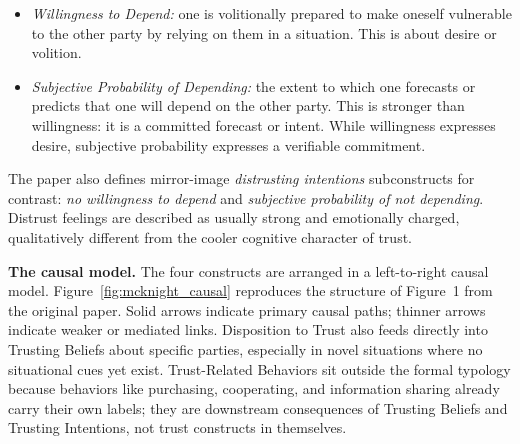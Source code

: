 \documentclass[11pt, a4paper]{article}
\begin{document}
\begin{itemize}[leftmargin=2em]
  \item \textit{Willingness to Depend:} one is volitionally prepared to make oneself vulnerable to the other party by relying on them in a situation. This is about desire or volition.
  \item \textit{Subjective Probability of Depending:} the extent to which one forecasts or predicts that one will depend on the other party. This is stronger than willingness: it is a committed forecast or intent. While willingness expresses desire, subjective probability expresses a verifiable commitment.
\end{itemize}

The paper also defines mirror-image \textit{distrusting intentions} subconstructs for contrast: \textit{no willingness to depend} and \textit{subjective probability of not depending}. Distrust feelings are described as usually strong and emotionally charged, qualitatively different from the cooler cognitive character of trust.

\textbf{The causal model.} The four constructs are arranged in a left-to-right causal model. Figure~\ref{fig:mcknight_causal} reproduces the structure of Figure~1 from the original paper. Solid arrows indicate primary causal paths; thinner arrows indicate weaker or mediated links. Disposition to Trust also feeds directly into Trusting Beliefs about specific parties, especially in novel situations where no situational cues yet exist. Trust-Related Behaviors sit outside the formal typology because behaviors like purchasing, cooperating, and information sharing already carry their own labels; they are downstream consequences of Trusting Beliefs and Trusting Intentions, not trust constructs in themselves.
\end{document}
